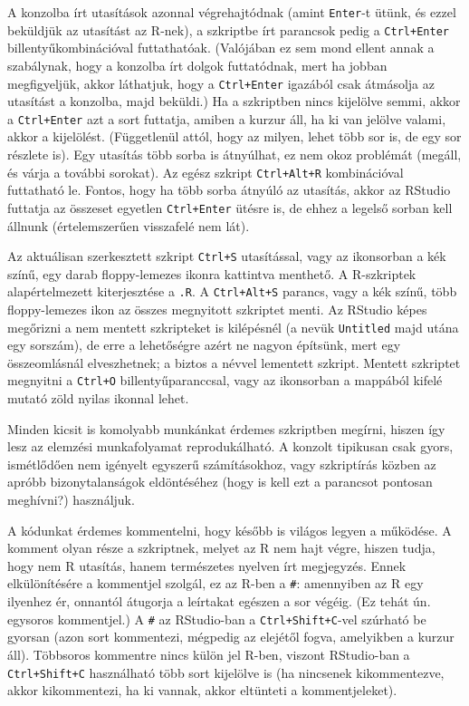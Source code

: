 \documentclass[]{book}
\begin{document}
A konzolba írt utasítások azonnal végrehajtódnak (amint \texttt{Enter}-t ütünk, és ezzel beküldjük az utasítást az R-nek), a szkriptbe írt parancsok pedig a \texttt{Ctrl+Enter} billentyűkombinációval futtathatóak. (Valójában ez sem mond ellent annak a szabálynak, hogy a konzolba írt dolgok futtatódnak, mert ha jobban megfigyeljük, akkor láthatjuk, hogy a \texttt{Ctrl+Enter} igazából csak átmásolja az utasítást a konzolba, majd beküldi.) Ha a szkriptben nincs kijelölve semmi, akkor a \texttt{Ctrl+Enter} azt a sort futtatja, amiben a kurzur áll, ha ki van jelölve valami, akkor a kijelölést. (Függetlenül attól, hogy az milyen, lehet több sor is, de egy sor részlete is). Egy utasítás több sorba is átnyúlhat, ez nem okoz problémát (megáll, és várja a további sorokat). Az egész szkript \texttt{Ctrl+Alt+R} kombinációval futtatható le. Fontos, hogy ha több sorba átnyúló az utasítás, akkor az RStudio futtatja az összeset egyetlen \texttt{Ctrl+Enter} ütésre is, de ehhez a legelső sorban kell állnunk (értelemszerűen visszafelé nem lát).

Az aktuálisan szerkesztett szkript \texttt{Ctrl+S} utasítással, vagy az ikonsorban a kék színű, egy darab floppy-lemezes ikonra kattintva menthető. A R-szkriptek alapértelmezett kiterjesztése a \texttt{.R}. A \texttt{Ctrl+Alt+S} parancs, vagy a kék színű, több floppy-lemezes ikon az összes megnyitott szkriptet menti. Az RStudio képes megőrizni a nem mentett szkripteket is kilépésnél (a nevük \texttt{Untitled} majd utána egy sorszám), de erre a lehetőségre azért ne nagyon építsünk, mert egy összeomlásnál elveszhetnek; a biztos a névvel lementett szkript. Mentett szkriptet megnyitni a \texttt{Ctrl+O} billentyűparanccsal, vagy az ikonsorban a mappából kifelé mutató zöld nyilas ikonnal lehet.

Minden kicsit is komolyabb munkánkat érdemes szkriptben megírni, hiszen így lesz az elemzési munkafolyamat reprodukálható. A konzolt tipikusan csak gyors, ismétlődően nem igényelt egyszerű számításokhoz, vagy szkriptírás közben az apróbb bizonytalanságok eldöntéséhez (hogy is kell ezt a parancsot pontosan meghívni?) használjuk.

A kódunkat érdemes kommentelni, hogy később is világos legyen a működése. A komment olyan része a szkriptnek, melyet az R nem hajt végre, hiszen tudja, hogy nem R utasítás, hanem természetes nyelven írt megjegyzés. Ennek elkülönítésére a kommentjel szolgál, ez az R-ben a \texttt{\#}: amennyiben az R egy ilyenhez ér, onnantól átugorja a leírtakat egészen a sor végéig. (Ez tehát ún. egysoros kommentjel.) A \texttt{\#} az RStudio-ban a \texttt{Ctrl+Shift+C}-vel szúrható be gyorsan (azon sort kommentezi, mégpedig az elejétől fogva, amelyikben a kurzur áll). Többsoros kommentre nincs külön jel R-ben, viszont RStudio-ban a \texttt{Ctrl+Shift+C} használható több sort kijelölve is (ha nincsenek kikommentezve, akkor kikommentezi, ha ki vannak, akkor eltünteti a kommentjeleket).
\end{document}
